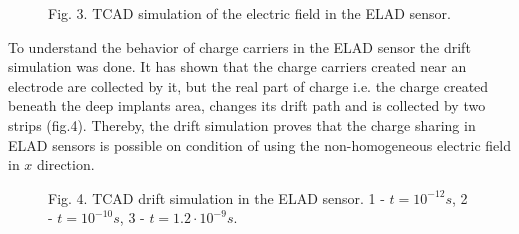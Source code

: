 \begin{figure}[h]

Fig. 3. TCAD simulation of the electric field in the ELAD sensor. 
\end{figure}

To understand the behavior of charge carriers in the ELAD sensor the drift simulation was done. It has shown that the charge carriers created near an electrode are collected by it, but the real part of charge i.e. the charge created beneath the deep implants area, changes its drift path and is collected by two strips (fig.4).  Thereby, the drift simulation proves that the charge sharing in ELAD sensors is possible on condition of using the non-homogeneous electric field in $x$ direction. 


\begin{figure}[h]

Fig. 4. TCAD drift simulation in the ELAD sensor. 1 - $t = 10^{-12} s$, 2 - $t = 10^{-10} s$, 3 - $t = 1.2 \cdot 10^{-9} s$. 
\end{figure}

